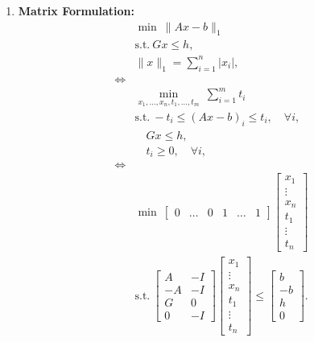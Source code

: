 \begin{example}
\begin{enumerate}
        \item \textbf{Matrix Formulation:}
        \begin{align*}
            &\min \ \|Ax - b\|_1 \\
            &\text{s.t.} \ Gx \leq h, \\
            &\|x\|_1 = \sum_{i=1}^n |x_i|, \\
            \iff & \\
            &\min_{x_1, \dots, x_n, t_1, \dots, t_m} \ \sum_{i=1}^m t_i \\
            &\text{s.t.} \ -t_i \leq (Ax - b)_i \leq t_i, \quad \forall i, \\
            &\quad Gx \leq h, \\
            &\quad t_i \geq 0, \quad \forall i, \\
            \iff & \\
            &\min \ \begin{bmatrix} 0 & \dots & 0 & 1 & \dots & 1 \end{bmatrix}
            \begin{bmatrix} x_1 \\ \vdots \\ x_n \\ t_1 \\ \vdots \\ t_n \end{bmatrix} \\
            &\text{s.t.} \ \begin{bmatrix} A & -I \\ -A & -I \\ G & 0 \\ 0 & -I \end{bmatrix}
            \begin{bmatrix} x_1 \\ \vdots \\ x_n \\ t_1 \\ \vdots \\ t_n\end{bmatrix}
            \leq \begin{bmatrix} b \\ -b \\ h \\ 0 \end{bmatrix}.
        \end{align*}
    \end{enumerate}   

     
\end{example}